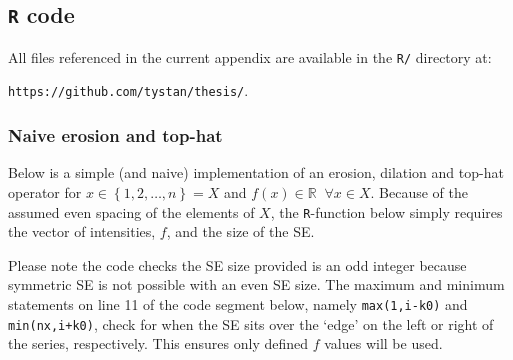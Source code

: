 \documentclass[12pt,a4paper,oneside]{report}
\begin{document}
\begin{appendix}




\chapter{\texttt{R} code} \label{app:R}


All files referenced in the current appendix are available in the \texttt{\textcolor{linkblue}{R/}} directory at:
\begin{center}
\texttt{\textcolor{linkblue}{https://github.com/tystan/thesis/}}.
\end{center}



\clearpage





\subsection{Naive erosion and top-hat} 

Below is a simple (and naive) implementation of an erosion, dilation and top-hat operator for $x \in \left\{ 1,2,\ldots,n \right\} = X$ and $ f \left( x \right) \in \mathds{R} \; \; \forall x \in X$. Because of the assumed even spacing of the elements of $X$, the {\tt R}-function below simply requires the vector of intensities, $f$, and the size of the SE. 

Please note the code checks the SE size provided is an odd integer because symmetric SE is not possible with an even SE size. The maximum and minimum statements on line 11 of the code segment below, namely {\tt max(1,i-k0)} and {\tt min(nx,i+k0)}, check for when the SE sits over the `edge' on the left or right of the series, respectively. This ensures only defined $f$ values will be used. \\


\end{appendix}
\end{document}
